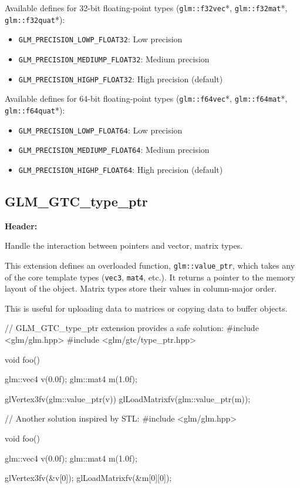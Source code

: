 \documentclass{scrartcl}
\numberwithin{figure}{subsection}
\begin{document}
Available defines for 32-bit floating-point types (\verb|glm::f32vec|*, \verb|glm::f32mat|*, \verb|glm::f32quat|*):

\begin{itemize}
    \item \verb|GLM_PRECISION_LOWP_FLOAT32|: Low precision
    \item \verb|GLM_PRECISION_MEDIUMP_FLOAT32|: Medium precision
    \item \verb|GLM_PRECISION_HIGHP_FLOAT32|: High precision (default)
\end{itemize}

Available defines for 64-bit floating-point types (\verb|glm::f64vec|*, \verb|glm::f64mat|*, \verb|glm::f64quat|*):

\begin{itemize}
    \item \verb|GLM_PRECISION_LOWP_FLOAT64|: Low precision
    \item \verb|GLM_PRECISION_MEDIUMP_FLOAT64|: Medium precision
    \item \verb|GLM_PRECISION_HIGHP_FLOAT64|: High precision (default)
\end{itemize}

\subsection{GLM\_GTC\_type\_ptr}
\textbf{Header:} 

Handle the interaction between pointers and vector, matrix types.

This extension defines an overloaded function, \verb|glm::value_ptr|, which takes any of the core template types (\verb|vec3|, \verb|mat4|, etc.). It returns a pointer to the memory layout of the object. Matrix types store their values in column-major order.

This is useful for uploading data to matrices or copying data to buffer objects.

\begin{cppcode}
// GLM_GTC_type_ptr extension provides a safe solution:
#include <glm/glm.hpp>
#include <glm/gtc/type_ptr.hpp>

void foo()
{
  glm::vec4 v(0.0f);
  glm::mat4 m(1.0f);

  glVertex3fv(glm::value_ptr(v)) 
  glLoadMatrixfv(glm::value_ptr(m));
}
\end{cppcode}

\begin{cppcode}
// Another solution inspired by STL:
#include <glm/glm.hpp>

void foo()
{
  glm::vec4 v(0.0f);
  glm::mat4 m(1.0f);

  glVertex3fv(&v[0]);
  glLoadMatrixfv(&m[0][0]);
}
\end{cppcode}
\end{document}
